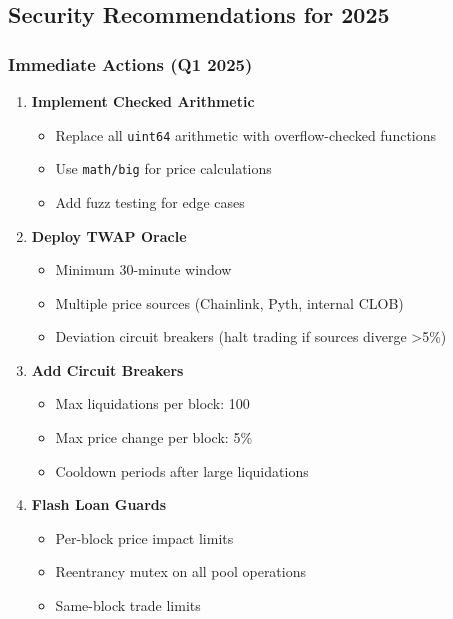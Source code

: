 \documentclass[
]{article}
\providecommand{\tightlist}{%
  \setlength{\itemsep}{0pt}\setlength{\parskip}{0pt}}
\begin{document}
\subsection{Security Recommendations for
2025}\label{security-recommendations-for-2025}

\subsubsection{Immediate Actions (Q1
2025)}\label{immediate-actions-q1-2025}

\begin{enumerate}
\def\labelenumi{\arabic{enumi}.}
\item
  \textbf{Implement Checked Arithmetic}

  \begin{itemize}
  \tightlist
  \item
    Replace all \texttt{uint64} arithmetic with overflow-checked
    functions
  \item
    Use \texttt{math/big} for price calculations
  \item
    Add fuzz testing for edge cases
  \end{itemize}
\item
  \textbf{Deploy TWAP Oracle}

  \begin{itemize}
  \tightlist
  \item
    Minimum 30-minute window
  \item
    Multiple price sources (Chainlink, Pyth, internal CLOB)
  \item
    Deviation circuit breakers (halt trading if sources diverge
    \textgreater5\%)
  \end{itemize}
\item
  \textbf{Add Circuit Breakers}

  \begin{itemize}
  \tightlist
  \item
    Max liquidations per block: 100
  \item
    Max price change per block: 5\%
  \item
    Cooldown periods after large liquidations
  \end{itemize}
\item
  \textbf{Flash Loan Guards}

  \begin{itemize}
  \tightlist
  \item
    Per-block price impact limits
  \item
    Reentrancy mutex on all pool operations
  \item
    Same-block trade limits
  \end{itemize}
\end{enumerate}
\end{document}
